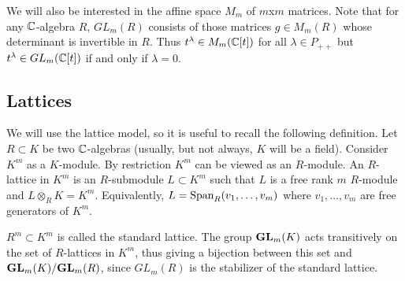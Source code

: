 \documentclass[draft]{article}
\begin{document}
We will also be interested in the affine space $ M_m$ of $m$x$m$ matrices.  Note that for any $ \mathbb C$-algebra $ R $,  $GL_m(R) $ consists of those matrices $ g \in M_m(R) $ whose determinant is invertible in $ R$.  Thus $ t^\lambda \in M_m(\mathbb C[t])$ for all $ \lambda \in P_{++}$ but $ t^\lambda \in GL_m(\mathbb C[t]) $ if and only if $ \lambda = 0 $.

\subsection{Lattices}
\label{ss:lat}
We will use the lattice model, so it is useful to recall the following definition. Let $ R \subset K$ be two $\mathbb C$-algebras (usually, but not always, $K$ will be a field). 
Consider $ K^m $ as a $K$-module. By restriction $ K^m$ can be viewed as an $R$-module.  An $R$-lattice in $K^m$ 
is an $R$-submodule $ L \subset K^m$ such that $ L $ is a free rank $ m $ $R$-module and $ L \otimes_R K = K^m $.  Equivalently, $ L = \operatorname{Span}_R(v_1, \dots, v_m)$ where $v_1, \dots, v_m$ are free generators of $K^m$. 
% 
\begin{comment}
\jcom{Maybe need that both $K$ and $R$ are integral domains and have the same field of fractions?} 
\acom{Roger has proved that what is written is ok.}
\rcom{Here's my argument: If $L \subset K^m$ is a free rank $m$ $R$-module and $L \otimes K = K^m$, then it's clear we that $L$ is generated by $m$ generators $v_1,\dots,v_m$ over $R$. Since $L\otimes K = K^m$, these also generate $K^m$ over $K$. Then we have a surjective map $K^m \twoheadrightarrow K^m$ given by sending a basis of $K^m$ to the generators $v_1,\dots,v_m$. Since any surjective endomorphism of finite $K$-modules is injective, the $v_1,\dots,v_m$ form a basis. I think the only thing that is needed is that the rings are commutative.}
\jcom{Great.}
\end{comment} 

$ R^m \subset K^m $ is called the standard lattice. 
The group ${\mathbf{GL}}_m(K) $ acts transitively on the set of $R$-lattices in $K^m$, thus giving a bijection between 
this set and ${\mathbf{GL}}_m(K)/{\mathbf{GL}}_m(R)$, since $ GL_m(R) $ is the stabilizer of the standard lattice. 
\end{document}
